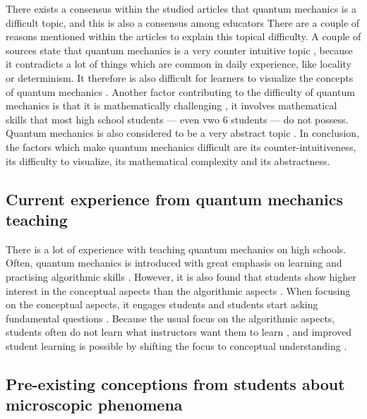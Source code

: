 \documentclass[11pt,twoside]{report} %
\begin{document}
There exists a consensus within the studied articles that quantum mechanics is a difficult topic, and this is also a consensus among educators \cite{papaphotis1,papaphotis2,gianino} There are a couple of reasons mentioned within the articles to explain this topical difficulty. A couple of sources state that quantum mechanics is a very counter intuitive topic \cite{mckagan, singh2, levrini, henriksen}, because it contradicts a lot of things which are common in daily experience, like locality or determinism. It therefore is also difficult for learners to visualize the concepts of quantum mechanics \cite{mckagan, henriksen}. Another factor contributing to the difficulty of quantum mechanics is that it is mathematically challenging \cite{mckagan,gianino}, it involves mathematical skills that most high school students --- even vwo 6 students --- do not possess. Quantum mechanics is also considered to be a very abstract topic \cite{mckagan, papaphotis1, singh1, gianino, barnes}. In conclusion, the factors which make quantum mechanics difficult are its counter-intuitiveness, its difficulty to visualize, its mathematical complexity and its abstractness.

\subsection{Current experience from quantum mechanics teaching}

There is a lot of experience with teaching quantum mechanics on high schools. Often, quantum mechanics is introduced with great emphasis on learning and practising algorithmic skills \cite{papaphotis1,papaphotis2}. However, it is also found that students show higher interest in the conceptual aspects than the algorithmic aspects \cite{papaphotis1,papaphotis2,levrini}. When focusing on the conceptual aspects, it engages students \cite{henriksen} and students start asking fundamental questions \cite{mckagan}. Because the usual focus on the algorithmic aspects, students often do not learn what instructors want them to learn \cite{mckagan,asikainen}, and improved student learning is possible by shifting the focus to conceptual understanding \cite{mckagan}.

\subsection{Pre-existing conceptions from students about microscopic phenomena}
\end{document}
